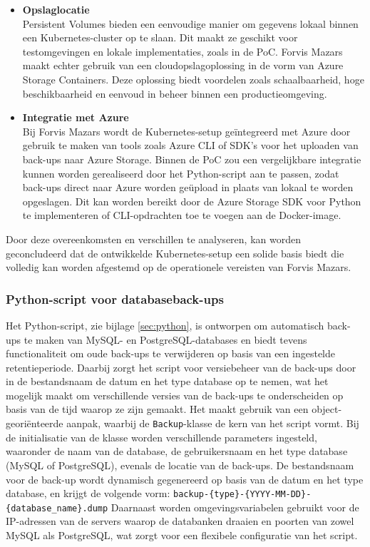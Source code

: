 \begin{itemize}
    \item \textbf{Opslaglocatie} \\
    Persistent Volumes bieden een eenvoudige manier om gegevens lokaal binnen een Kubernetes-cluster op te slaan. Dit maakt ze geschikt voor testomgevingen en lokale implementaties, zoals in de PoC. Forvis Mazars maakt echter gebruik van een cloudopslagoplossing in de vorm van Azure Storage Containers. Deze oplossing biedt voordelen zoals schaalbaarheid, hoge beschikbaarheid en eenvoud in beheer binnen een productieomgeving.
    
    \item \textbf{Integratie met Azure} \\
    Bij Forvis Mazars wordt de Kubernetes-setup geïntegreerd met Azure door gebruik te maken van tools zoals Azure CLI of SDK’s voor het uploaden van back-ups naar Azure Storage. Binnen de PoC zou een vergelijkbare integratie kunnen worden gerealiseerd door het Python-script aan te passen, zodat back-ups direct naar Azure worden geüpload in plaats van lokaal te worden opgeslagen. Dit kan worden bereikt door de Azure Storage SDK voor Python te implementeren of CLI-opdrachten toe te voegen aan de Docker-image.
\end{itemize}

Door deze overeenkomsten en verschillen te analyseren, kan worden geconcludeerd dat de ontwikkelde Kubernetes-setup een solide basis biedt die volledig kan worden afgestemd op de operationele vereisten van Forvis Mazars.

\subsubsection{Python-script voor databaseback-ups}
Het Python-script, zie bijlage \ref{sec:python}, is ontworpen om automatisch back-ups te maken van MySQL- en PostgreSQL-databases en biedt tevens functionaliteit om oude back-ups te verwijderen op basis van een ingestelde retentieperiode. Daarbij zorgt het script voor versiebeheer van de back-ups door in de bestandsnaam de datum en het type database op te nemen, wat het mogelijk maakt om verschillende versies van de back-ups te onderscheiden op basis van de tijd waarop ze zijn gemaakt.  Het maakt gebruik van een object-georiënteerde aanpak, waarbij de \texttt{Backup}-klasse de kern van het script vormt. Bij de initialisatie van de klasse worden verschillende parameters ingesteld, waaronder de naam van de database, de gebruikersnaam en het type database (MySQL of PostgreSQL), evenals de locatie van de back-ups. De bestandsnaam voor de back-up wordt dynamisch gegenereerd op basis van de datum en het type database, en krijgt de volgende vorm:
\newline \texttt{backup-\{type\}-\{YYYY-MM-DD\}-\{database\_name\}.dump}
\newline Daarnaast worden omgevingsvariabelen gebruikt voor de IP-adressen van de servers waarop de databanken draaien en poorten van zowel MySQL als PostgreSQL, wat zorgt voor een flexibele configuratie van het script.

